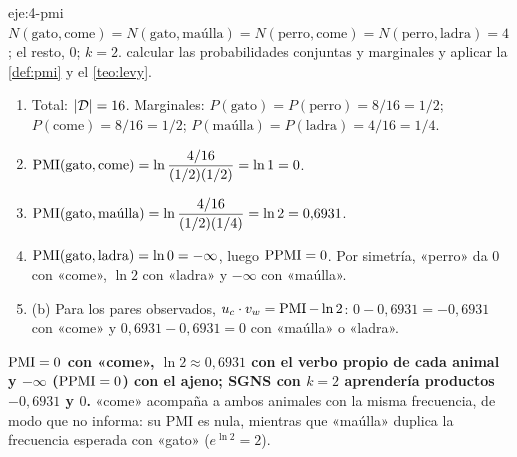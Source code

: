 \begin{solucion}{eje:4-pmi}
\datos $N(\text{gato},\text{come})=N(\text{gato},\text{maúlla})=N(\text{perro},\text{come})=N(\text{perro},\text{ladra})=4$; el resto, 0; $k=2$.
\planteamiento calcular las probabilidades conjuntas y marginales y aplicar la \cref{def:pmi} y el \cref{teo:levy}.
\pasos
\begin{enumerate}[label=\arabic*.]
  \item Total: $\lvert\mathcal{D}\rvert=16$. Marginales: $P(\text{gato})=P(\text{perro})=8/16=1/2$; $P(\text{come})=8/16=1/2$; $P(\text{maúlla})=P(\text{ladra})=4/16=1/4$.
  \item $\operatorname{PMI}(\text{gato},\text{come})=\ln\dfrac{4/16}{(1/2)(1/2)}=\ln 1=0$.
  \item $\operatorname{PMI}(\text{gato},\text{maúlla})=\ln\dfrac{4/16}{(1/2)(1/4)}=\ln 2=0{,}6931$.
  \item $\operatorname{PMI}(\text{gato},\text{ladra})=\ln 0=-\infty$, luego $\operatorname{PPMI}=0$. Por simetría, «perro» da $0$ con «come», $\ln 2$ con «ladra» y $-\infty$ con «maúlla».
  \item (b) Para los pares observados, $u_c\cdot v_w=\operatorname{PMI}-\ln 2$: $0-0{,}6931=-0{,}6931$ con «come» y $0{,}6931-0{,}6931=0$ con «maúlla» o «ladra».
\end{enumerate}
\resultado \textbf{$\operatorname{PMI}=0$ con «come», $\ln 2\approx 0{,}6931$ con el verbo propio de cada animal y $-\infty$ ($\operatorname{PPMI}=0$) con el ajeno; SGNS con $k=2$ aprendería productos $-0{,}6931$ y $0$.}
\comprobacion «come» acompaña a ambos animales con la misma frecuencia, de modo que no informa: su PMI es nula, mientras que «maúlla» duplica la frecuencia esperada con «gato» ($e^{\ln 2}=2$).
\end{solucion}

